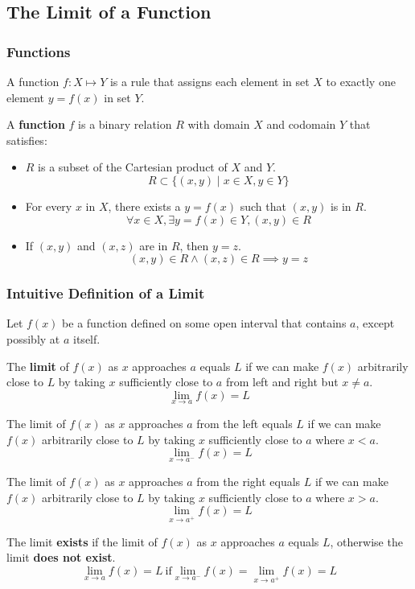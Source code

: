\subsection{The Limit of a Function}

\subsubsection{Functions}
A function \(f:X\mapsto Y\) is a rule that assigns each element in set \(X\)
to exactly one element \(y=f(x)\) in set \(Y\).
\begin{definition}
    A \textbf{function} \(f\) is a binary relation \(R\) with domain \(X\) and
    codomain \(Y\) that satisfies:
    \begin{itemize}
        \item \(R\) is a subset of the Cartesian product of \(X\) and \(Y\).
        \[R\subset\{(x,y)\mid x\in X,y\in Y\}\]
        \item For every \(x\) in \(X\), there exists a \(y=f(x)\) such that
        \((x,y)\) is in \(R\).
        \[\forall x\in X,\exists y=f(x)\in Y,(x,y)\in R\]
        \item If \((x,y)\) and \((x,z)\) are in \(R\), then \(y=z\).
        \[(x,y)\in R \wedge (x,z)\in R \implies y=z\]
    \end{itemize}
\end{definition}

\subsubsection{Intuitive Definition of a Limit}
Let \(f(x)\) be a function defined on some open interval that contains \(a\),
except possibly at \(a\) itself.
\begin{definition}
    The \textbf{limit} of \(f(x)\) as \(x\) approaches \(a\) equals \(L\) if
    we can make \(f(x)\) arbitrarily close to \(L\) by taking \(x\)
    sufficiently close to \(a\) from left and right but \(x\neq a\).
    \[\lim_{x\to a}f(x)=L\]
\end{definition}
\begin{definition}
    The limit of \(f(x)\) as \(x\) approaches \(a\) from the left equals \(L\)
    if we can make \(f(x)\) arbitrarily close to \(L\) by taking \(x\)
    sufficiently close to \(a\) where \(x<a\).
    \[\lim_{x\to a^-}f(x)=L\]
\end{definition}
\begin{definition}
    The limit of \(f(x)\) as \(x\) approaches \(a\) from the right equals
    \(L\) if we can make \(f(x)\) arbitrarily close to \(L\) by taking \(x\)
    sufficiently close to \(a\) where \(x>a\).
    \[\lim_{x\to a^+}f(x)=L\]
\end{definition}
The limit \textbf{exists} if the limit of \(f(x)\) as \(x\) approaches \(a\)
equals \(L\), otherwise the limit \textbf{does not exist}.
\[\lim_{x\to a}f(x)=L\ \text{if} \lim_{x\to a^-}f(x)=\lim_{x\to a^+}f(x)=L\]